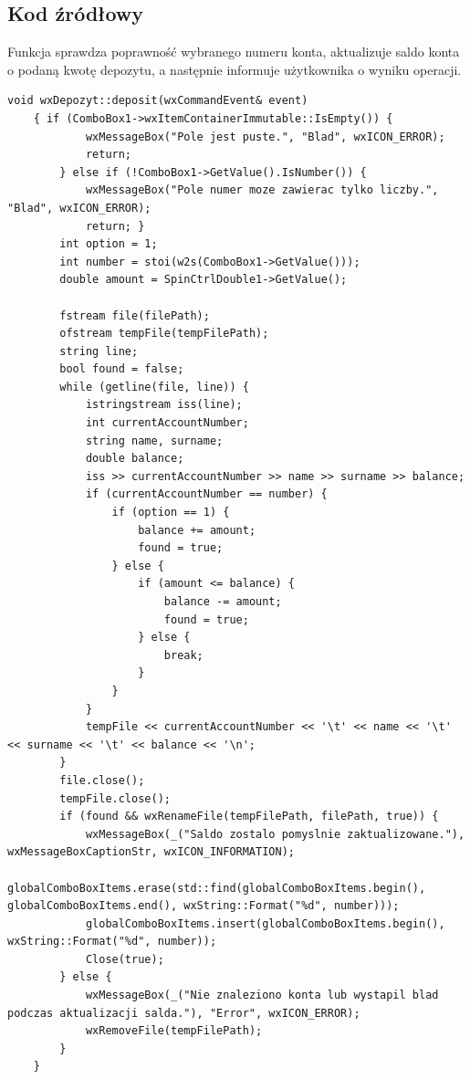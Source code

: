 \documentclass[a4paper,12pt]{article}
\begin{document}
\subsection{Kod źródłowy}
Funkcja sprawdza poprawność wybranego numeru konta, aktualizuje saldo konta o podaną kwotę depozytu, a następnie informuje użytkownika o wyniku operacji.
\begin{lstlisting}
void wxDepozyt::deposit(wxCommandEvent& event)
	{ if (ComboBox1->wxItemContainerImmutable::IsEmpty()) {
			wxMessageBox("Pole jest puste.", "Blad", wxICON_ERROR);
			return;
		} else if (!ComboBox1->GetValue().IsNumber()) {
			wxMessageBox("Pole numer moze zawierac tylko liczby.", "Blad", wxICON_ERROR);
			return; }
		int option = 1;
		int number = stoi(w2s(ComboBox1->GetValue()));
		double amount = SpinCtrlDouble1->GetValue();
		
		fstream file(filePath);
		ofstream tempFile(tempFilePath);
		string line;
		bool found = false;
		while (getline(file, line)) {
			istringstream iss(line);
			int currentAccountNumber;
			string name, surname;
			double balance;
			iss >> currentAccountNumber >> name >> surname >> balance;
			if (currentAccountNumber == number) {
				if (option == 1) {
					balance += amount;
					found = true;
				} else {
					if (amount <= balance) {
						balance -= amount;
						found = true;
					} else {
						break;
					}
				}
			}
			tempFile << currentAccountNumber << '\t' << name << '\t' << surname << '\t' << balance << '\n';
		}
		file.close();
		tempFile.close();
		if (found && wxRenameFile(tempFilePath, filePath, true)) {
			wxMessageBox(_("Saldo zostalo pomyslnie zaktualizowane."), wxMessageBoxCaptionStr, wxICON_INFORMATION);
			globalComboBoxItems.erase(std::find(globalComboBoxItems.begin(), globalComboBoxItems.end(), wxString::Format("%d", number)));
			globalComboBoxItems.insert(globalComboBoxItems.begin(), wxString::Format("%d", number));
			Close(true);
		} else {
			wxMessageBox(_("Nie znaleziono konta lub wystapil blad podczas aktualizacji salda."), "Error", wxICON_ERROR);
			wxRemoveFile(tempFilePath);
		}
	}
\end{lstlisting}
\end{document}

